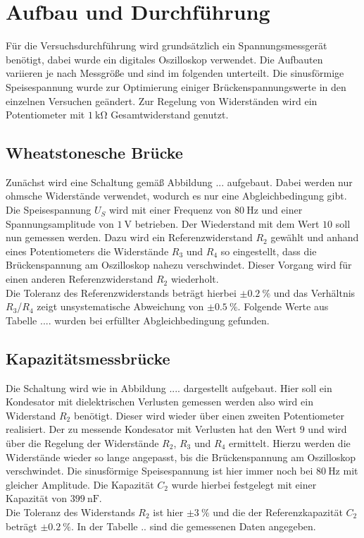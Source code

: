 \section{Aufbau und Durchführung}

Für die Versuchsdurchführung wird grundsätzlich ein Spannungsmessgerät benötigt, dabei wurde ein digitales Oszilloskop verwendet. Die Aufbauten variieren je nach Messgröße und sind
im folgenden unterteilt. Die sinusförmige Speisespannung wurde zur Optimierung einiger Brückenspannungswerte in den einzelnen Versuchen geändert. Zur Regelung von Widerständen wird ein Potentiometer mit $\SI{1}{\kilo\ohm}$ Gesamtwiderstand 
genutzt.

\subsection{Wheatstonesche Brücke}
\label{sec:weedyo}
Zunächst wird eine Schaltung gemäß Abbildung ... aufgebaut. Dabei werden nur ohmsche Widerstände verwendet, wodurch es nur eine Abgleichbedingung gibt. Die Speisespannung $U_{S}$ wird mit einer Frequenz von
$\SI{80}{\hertz}$ und einer Spannungsamplitude von $\SI{1}{\volt}$ betrieben. Der Wiederstand mit dem Wert $10$ soll nun gemessen werden. Dazu wird ein Referenzwiderstand $R_{2}$ gewählt und anhand eines Potentiometers die Widerstände 
$R_{3}$ und $R_{4}$ so eingestellt, dass die Brückenspannung am Oszilloskop nahezu verschwindet. Dieser Vorgang wird für einen anderen Referenzwiderstand $R_{2}$ wiederholt. 
\\
\newline
Die Toleranz des Referenzwiderstands beträgt hierbei $\pm\SI{0.2}{\percent}$ und das Verhältnis $R_{3}$/$R_{4}$ zeigt unsystematische Abweichung von $\pm\SI{0.5}{\percent}$.
Folgende Werte aus Tabelle .... wurden bei erfüllter Abgleichbedingung gefunden.

\subsection{Kapazitätsmessbrücke}
\label{sec:nocapyo}
Die Schaltung wird wie in Abbildung .... dargestellt aufgebaut. Hier soll ein Kondesator mit dielektrischen Verlusten gemessen werden also wird ein Widerstand $R_{2}$ benötigt. Dieser wird wieder über einen
zweiten Potentiometer realisiert. Der zu messende Kondesator mit 
Verlusten hat den Wert $9$ und wird über die Regelung der Widerstände $R_{2}$, $R_{3}$ und $R_{4}$ ermittelt. Hierzu werden die Widerstände wieder so lange angepasst, bis die Brückenspannung am Oszilloskop verschwindet.
Die sinusförmige Speisespannung ist hier immer noch bei $\SI{80}{\hertz}$ mit gleicher Amplitude. Die Kapazität $C_{2}$ wurde hierbei festgelegt mit einer Kapazität von $\SI{399}{\nano\farad}$.
\\
\newline
Die Toleranz des Widerstands $R_{2}$ ist hier $\pm\SI{3}{\percent}$ und die der Referenzkapazität $C_{2}$ beträgt $\pm\SI{0.2}{\percent}$.
In der Tabelle .. sind die gemessenen Daten angegeben.

